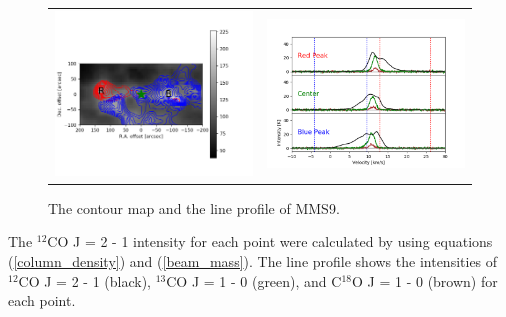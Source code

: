 \begin{figure}[h!]
	\begin{center}
		\begin{tabular}{cc}
			\includegraphics[width=7cm]{Orion_12CO2-1_MMS9_rbcontour_400_modified} &   \includegraphics[width=7cm]{Orion_12CO2-1_MMS9_line_profile_400}
		\end{tabular}	
		\caption{The contour map and the line profile of MMS9. }
	\label{fig:MMS921}
	\end{center}
\end{figure}

\clearpage
\newpage
\noindent The $^{12}$CO J = 2 - 1 intensity for each point were calculated by using equations (\ref{column_density}) and (\ref{beam_mass}). The line profile shows the intensities of $^{12}$CO J = 2 - 1 (black), $^{13}$CO J = 1 - 0 (green), and C$^{18}$O J = 1 - 0 (brown) for each point. 

